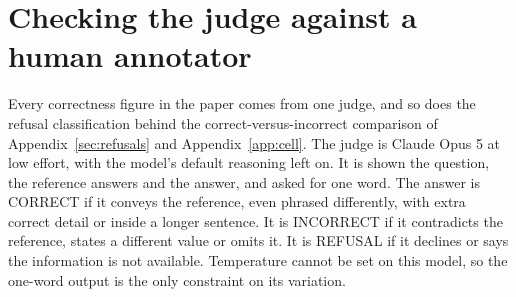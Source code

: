 \documentclass[11pt]{article}
\newcommand{\movedref}{Appendix}            %
\newcommand{\movedref}{Section}
\begin{document}
\begin{table}[t]
\centering
{}
\caption{Correctness from graded judgement, over the thirty-two judged cells of the matched grid. The raw cell runs from 17 to 48 per cent of queries; the share that is a grounded, committed, wrong answer runs from 4.5 to 11.4 per cent. The two open-weight generators refuse least often within this cell and therefore leave the largest committed-wrong share, so the cell's size and its interpretable remainder do not order the generators the same way.}
\label{tab:6}
\end{table}


\section{Checking the judge against a human annotator}
\label{app:human}

Every correctness figure in the paper comes from one judge, and so does the refusal classification behind the correct-versus-incorrect comparison of \movedref~\ref{sec:refusals} and Appendix~\ref{app:cell}. The judge is Claude Opus 5 at low effort, with the model's default reasoning left on. It is shown the question, the reference answers and the answer, and asked for one word. The answer is CORRECT if it conveys the reference, even phrased differently, with extra correct detail or inside a longer sentence. It is INCORRECT if it contradicts the reference, states a different value or omits it. It is REFUSAL if it declines or says the information is not available. Temperature cannot be set on this model, so the one-word output is the only constraint on its variation.
\end{document}
